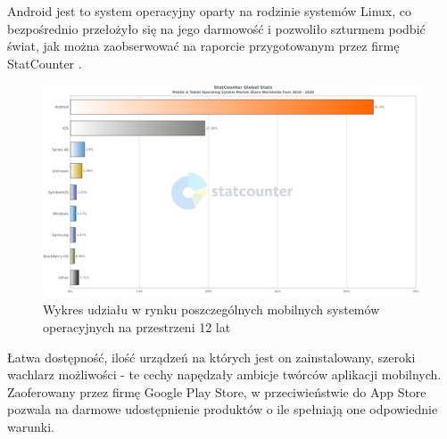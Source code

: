 \documentclass[12pt, a4paper]{article}
\begin{document}
\begin{sloppypar}
{{    Android jest to system operacyjny oparty na rodzinie systemów Linux, co bezpośrednio
    przełożyło się na jego darmowość i pozwoliło szturmem podbić świat, jak można
    zaobserwować na raporcie przygotowanym przez firmę StatCounter \cite{os}.
    \begin{figure}[H]
      \centering
      \includegraphics[width=.9\textwidth]{android_chart.png}
      \caption{Wykres udziału w rynku poszczególnych mobilnych systemów operacyjnych na przestrzeni 12 lat}
      \label{fig:android}
    \end{figure}
    Łatwa dostępność, ilość urządzeń na których jest on zainstalowany, szeroki wachlarz
    możliwości - te cechy napędzały ambicje twórców aplikacji mobilnych. Zaoferowany
    przez firmę Google Play Store, w przeciwieństwie do App Store pozwala na darmowe
    udostępnienie produktów o ile spełniają one odpowiednie warunki.

}}
\end{sloppypar}
\end{document}
